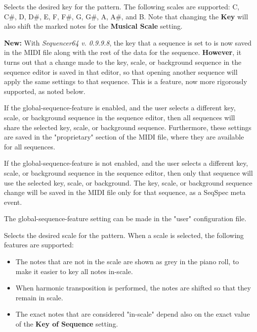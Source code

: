    Selects the desired key for the pattern.  The following scales are
   supported:  C, C\#, D, D\#, E, F, F\#, G, G\#, A, A\#, and B.
   Note that changing the \textbf{Key} will also shift the marked notes
   for the \textbf{Musical Scale} setting.

   \textbf{New:}
   With \textsl{Sequencer64 v. 0.9.9.8}, the key that a sequence is set to is
   now saved in the MIDI file along with the rest of the data for the sequence.
   \textbf{However},
   it turns out that a change made to the key, scale, or background sequence in
   the sequence editor is saved in that editor, so that opening another sequence
   will apply the same settings to that sequence.  This is a feature, now
   more rigorously supported, as noted below.

   If the global-sequence-feature is enabled, and the user selects
   a different key, scale, or background sequence in the sequence editor, 
   then all sequences will share the selected key, scale, or background
   sequence.  Furthermore, these settings are saved in the "proprietary"
   section of the MIDI file, where they are available for all sequences.

   If the global-sequence-feature is not enabled, and the user selects
   a different key, scale, or background sequence in the sequence editor, 
   then only that sequence will use the selected key, scale, or background.
   The key, scale, or background sequence change will be saved in the MIDI file
   only for that sequence, as a SeqSpec meta event.

   The global-sequence-feature setting can be made in the "user" configuration
   file.

   Selects the desired scale for the pattern.
   When a scale is selected, the following features are supported:

   \begin{itemize}
      \item The notes that are not in the scale are shown as grey in the piano
         roll, to make it easier to key all notes in-scale.
      \item When harmonic transposition is performed, the notes are shifted
         so that they remain in scale.
      \item The exact notes that are considered "in-scale" depend also on the 
         exact value of the \textbf{Key of Sequence} setting.
   \end{itemize}

